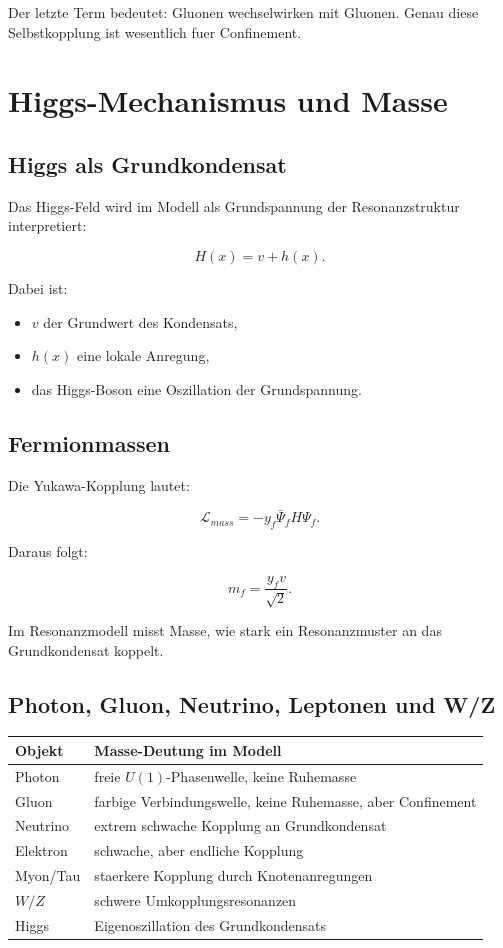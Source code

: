 \documentclass[11pt,a4paper]{article}
\begin{document}
Der letzte Term bedeutet: Gluonen wechselwirken mit Gluonen. Genau diese Selbstkopplung ist wesentlich fuer
Confinement.

\section{Higgs-Mechanismus und Masse}

\subsection{Higgs als Grundkondensat}

Das Higgs-Feld wird im Modell als Grundspannung der Resonanzstruktur interpretiert:

\[
H(x)=v+h(x).
\]

Dabei ist:
\begin{itemize}
  \item $v$ der Grundwert des Kondensats,
  \item $h(x)$ eine lokale Anregung,
  \item das Higgs-Boson eine Oszillation der Grundspannung.
\end{itemize}

\subsection{Fermionmassen}

Die Yukawa-Kopplung lautet:

\[
\mathcal{L}_{mass}=-y_f\bar{\Psi}_fH\Psi_f.
\]

Daraus folgt:

\[
m_f=\frac{y_fv}{\sqrt{2}}.
\]

Im Resonanzmodell misst Masse, wie stark ein Resonanzmuster an das Grundkondensat koppelt.

\subsection{Photon, Gluon, Neutrino, Leptonen und W/Z}

\begin{longtable}{>{\raggedright\arraybackslash}p{4cm}p{9cm}}
\toprule
Objekt & Masse-Deutung im Modell \\
\midrule
Photon & freie $U(1)$-Phasenwelle, keine Ruhemasse \\
Gluon & farbige Verbindungswelle, keine Ruhemasse, aber Confinement \\
Neutrino & extrem schwache Kopplung an Grundkondensat \\
Elektron & schwache, aber endliche Kopplung \\
Myon/Tau & staerkere Kopplung durch Knotenanregungen \\
$W/Z$ & schwere Umkopplungsresonanzen \\
Higgs & Eigenoszillation des Grundkondensats \\
\bottomrule
\end{longtable}
\end{document}

